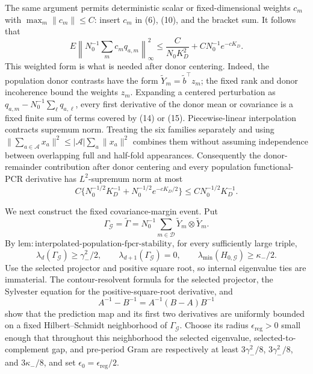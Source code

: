 The same argument permits deterministic scalar or fixed-dimensional weights
\(c_m\) with \(\max_m\|c_m\|\leq C\): insert \(c_m\) in (6), (10), and
the bracket sum.  It follows that
\[
 E\left\|N_0^{-1}\sum_m c_mq_{a,m}\right\|_\infty^2
 \leq\frac{C}{N_0K_D^2}+C N_0^{-1}e^{-cK_D}.           \tag{15}
\]
This weighted form is what is needed after donor centering.  Indeed, the
population donor contrasts have the form
\(\widetilde Y_m=\widetilde b^{\top}z_m\); the fixed rank and donor
incoherence bound the weights \(z_m\).  Expanding a centered perturbation as
\(q_{a,m}-N_0^{-1}\sum_\ell q_{a,\ell}\), every first derivative of the
donor mean or covariance is a fixed finite sum of terms covered by (14) or
(15).  Piecewise-linear interpolation contracts supremum norm.  Treating the
six families separately and using
\(\|\sum_{a\in\mathscr A}x_a\|^2\leq
|\mathscr A|\sum_a\|x_a\|^2\) combines them without assuming independence
between overlapping full and half-fold appearances.  Consequently the
donor-remainder contribution after donor centering and every population
functional-PCR derivative has \(L^2\)-supremum norm at most
\[
 C\{N_0^{-1/2}K_D^{-1}+N_0^{-1/2}e^{-cK_D/2}\}
 \leq C N_0^{-1/2}K_D^{-1}.                            \tag{16}
\]

We next construct the fixed covariance-margin event.  Put
\[
 \Gamma_{\mathcal G}=\widetilde\Gamma
 =N_0^{-1}\sum_{m\in\mathcal D}
   \widetilde Y_m\otimes\widetilde Y_m.
\]
By
\(\mathrm{lem:interpolated\mbox{-}population\mbox{-}fpcr\mbox{-}stability}\),
for every sufficiently large triple,
\[
 \lambda_d(\Gamma_{\mathcal G})\geq\gamma_-^2/2,
 \qquad \lambda_{d+1}(\Gamma_{\mathcal G})=0,
 \qquad \lambda_{\min}(H_{0,\mathcal G})\geq\kappa_-/2. \tag{17}
\]
Use the selected projector and positive square root, so internal eigenvalue
ties are immaterial.  The contour-resolvent formula for the selected
projector, the Sylvester equation for the positive-square-root derivative,
and
\[
 A^{-1}-B^{-1}=A^{-1}(B-A)B^{-1}                       \tag{18}
\]
show that the prediction map and its first two derivatives are uniformly
bounded on a fixed Hilbert--Schmidt neighborhood of
\(\Gamma_{\mathcal G}\).  Choose its radius
\(\epsilon_{\mathrm{reg}}>0\) small enough that throughout this neighborhood
the selected eigenvalue, selected-to-complement gap, and pre-period Gram are
respectively at least \(3\gamma_-^2/8\), \(3\gamma_-^2/8\), and
\(3\kappa_-/8\), and set \(\epsilon_0=\epsilon_{\mathrm{reg}}/2\).

